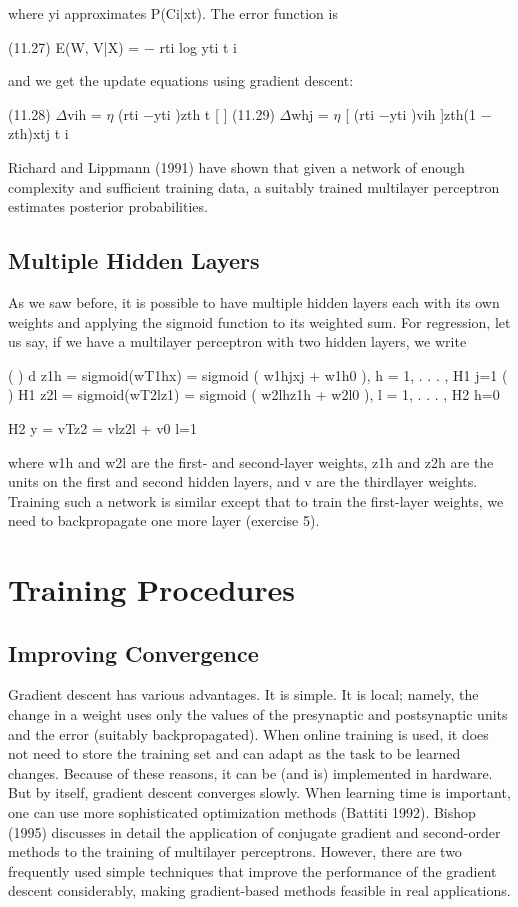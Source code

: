 where yi approximates P(Ci|xt). The error function is

(11.27) E(W, V|X) = $-$ rti log yti t i

and we get the update equations using gradient descent:

(11.28) $\Delta$vih = $\eta$ (rti $-$yti )zth t [ ] (11.29) $\Delta$whj = $\eta$ [ (rti $-$yti )vih ]zth(1 $-$zth)xtj t i

Richard and Lippmann (1991) have shown that given a network of enough complexity and sufficient training data, a suitably trained multilayer perceptron estimates posterior probabilities.

\subsection{Multiple Hidden Layers}

As we saw before, it is possible to have multiple hidden layers each with its own weights and applying the sigmoid function to its weighted sum. For regression, let us say, if we have a multilayer perceptron with two hidden layers, we write

( ) d z1h = sigmoid(wT1hx) = sigmoid ( w1hjxj + w1h0 ), h = 1, . . . , H1 j=1 ( ) H1 z2l = sigmoid(wT2lz1) = sigmoid ( w2lhz1h + w2l0 ), l = 1, . . . , H2 h=0

H2 y = vTz2 = vlz2l + v0 l=1

where w1h and w2l are the first- and second-layer weights, z1h and z2h are the units on the first and second hidden layers, and v are the thirdlayer weights. Training such a network is similar except that to train the first-layer weights, we need to backpropagate one more layer (exercise 5).

\section{Training Procedures}

\subsection{Improving Convergence}

Gradient descent has various advantages. It is simple. It is local; namely, the change in a weight uses only the values of the presynaptic and postsynaptic units and the error (suitably backpropagated). When online training is used, it does not need to store the training set and can adapt as the task to be learned changes. Because of these reasons, it can be (and is) implemented in hardware. But by itself, gradient descent converges slowly. When learning time is important, one can use more sophisticated optimization methods (Battiti 1992). Bishop (1995) discusses in detail the application of conjugate gradient and second-order methods to the training of multilayer perceptrons. However, there are two frequently used simple techniques that improve the performance of the gradient descent considerably, making gradient-based methods feasible in real applications.

